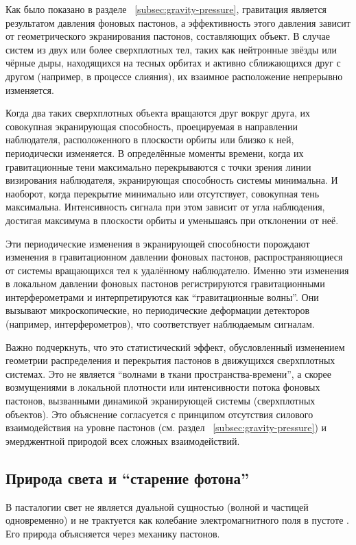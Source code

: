 \documentclass[pdflatex,sn-mathphys-num,referee]{sn-jnl}
\begin{document}
Как было показано в разделе ~\ref{subsec:gravity-pressure}, гравитация является результатом давления фоновых пастонов, а эффективность этого давления зависит от геометрического экранирования пастонов, составляющих объект. В случае систем из двух или более сверхплотных тел, таких как нейтронные звёзды или чёрные дыры, находящихся на тесных орбитах и активно сближающихся друг с другом (например, в процессе слияния), их взаимное расположение непрерывно изменяется.

Когда два таких сверхплотных объекта вращаются друг вокруг друга, их совокупная экранирующая способность, проецируемая в направлении наблюдателя, расположенного в плоскости орбиты или близко к ней, периодически изменяется. В определённые моменты времени, когда их гравитационные тени максимально перекрываются с точки зрения линии визирования наблюдателя, экранирующая способность системы минимальна. И наоборот, когда перекрытие минимально или отсутствует, совокупная тень максимальна. Интенсивность сигнала при этом зависит от угла наблюдения, достигая максимума в плоскости орбиты и уменьшаясь при отклонении от неё.

Эти периодические изменения в экранирующей способности порождают изменения в гравитационном давлении фоновых пастонов, распространяющиеся от системы вращающихся тел к удалённому наблюдателю. Именно эти изменения в локальном давлении фоновых пастонов регистрируются гравитационными интерферометрами и интерпретируются как ``гравитационные волны''. Они вызывают микроскопические, но периодические деформации детекторов (например, интерферометров), что соответствует наблюдаемым сигналам.

Важно подчеркнуть, что это статистический эффект, обусловленный изменением геометрии распределения и перекрытия пастонов в движущихся сверхплотных системах. Это не является ``волнами в ткани пространства-времени'', а скорее возмущениями в локальной плотности или интенсивности потока фоновых пастонов, вызванными динамикой экранирующей системы (сверхплотных объектов). Это объяснение согласуется с принципом отсутствия силового взаимодействия на уровне пастонов (см. раздел ~\ref{subsec:gravity-pressure}) и эмерджентной природой всех сложных взаимодействий.

\subsection{Природа света и ``старение фотона''}\label{subsec:light-aging}

В пасталогии свет не является дуальной сущностью (волной и частицей одновременно) \cite{debroglie1924-thesis} и не трактуется как колебание электромагнитного поля в пустоте \cite{maxwell1873-treatise}. Его природа объясняется через механику пастонов. 
\end{document}
